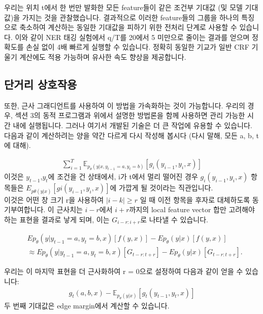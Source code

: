 \documentclass{article}
\begin{document}
우리는 위치 t에서 한 번만 발화한 모든 feature들이 같은 조건부 기대값 (및 모델 기대값)을 가지는 것을 관찰했습니다. 결과적으로 이러한 feature들의 그룹을 하나의 특징으로 축소하여 계산하는 동일한 기대값을 피하기 위한 전처리 단계로 사용할 수 있습니다. 이와 같이 NER 태깅 실험에서 q/T를 20에서 5 미만으로 줄이는 결과를 얻으며 정확도를 손실 없이 4배 빠르게 실행할 수 있습니다. 정확히 동일한 기교가 일반 CRF 기울기 계산에도 적용 가능하며 유사한 속도 향상을 제공합니다.

\subsection{단거리 상호작용}
또한, 근사 그래디언트를 사용하여 이 방법을 가속화하는 것이 가능합니다. 우리의 경우, 섹션 3의 동적 프로그램과 위에서 설명한 방법론을 함께 사용하면 관리 가능한 시간 내에 실행됩니다. 그러나 여기서 개발된 기술은 더 큰 작업에 유용할 수 있습니다.\\
다음과 같이 계산하려는 양을 약간 다르게 다시 작성해 봅시다 (다시 말해, 모든 a, b, t에 대해).

\begin{align}
    \sum_{i=1}^{T} \mathbb{E}_{p_{\theta}(y|x, y_{t-1}=a, y_t=b)} [g_i(y_{i-1}, y_i, x)]
\end{align}
이것은 $y_{t−1}$,$y_t$에 조건을 건 상태에서, i가 t에서 멀리 떨어진 경우 $g_i(y_{i−1}, y_i, x)$ 항목들은 $E_{pθ(y|x)}[gi(y_{i−1}, y_i, x)]$에 가깝게 될 것이라는 직관입니다.\\

이것은 어떤 창 크기 r을 사용하여 $\vert i − k \vert \geq r$ 일 때 이전 항목을 후자로 대체하도록 동기부여합니다. 이 근사치는 $i−r$에서 $i+r$까지의 local feature vector 합만 고려해야 하는 표현을 결과로 낳게 되며, 이는 $G_{i−r:i+r}$로 나타낼 수 있습니다.

\begin{align}
    &Ep_\theta(y|y_{t-1}=a,y_t=b,x)[f(y, x)] - Ep_\theta(y|x)[f(y, x)] \nonumber \\
    &\approx Ep_\theta(y|y_{t-1}=a,y_t=b,x)[G_{t-r:t+r}] - Ep_\theta(y|x)[G_{t-r:t+r}].
\end{align}

우리는 이 마지막 표현을 더 근사화하여 r = 0으로 설정하여 다음과 같이 얻을 수 있습니다:
\begin{align}
    g_{t}(a, b, x) - \mathbb{E}_{p_\theta(y|x)}[g_{t}(y_{t-1}, y_t, x)]
\end{align}
두 번째 기대값은 edge margin에서 계산할 수 있습니다.\\
\end{document}
